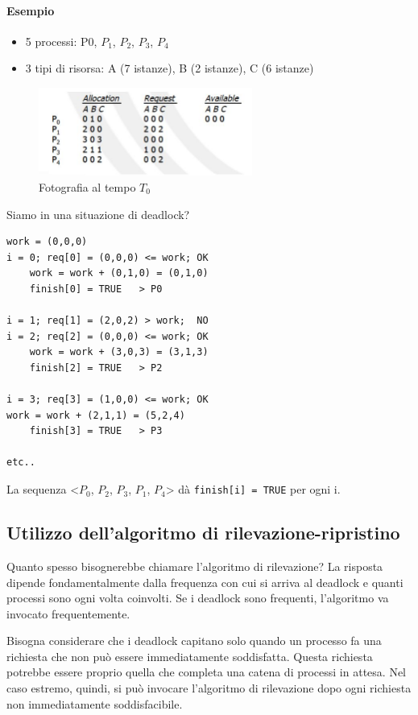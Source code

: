 \documentclass[a4paper]{article}
\begin{document}
\paragraph{Esempio}
\begin{itemize}
    \item 5 processi: P0, $P_1$, $P_2$, $P_3$, $P_4$
    \item 3 tipi di risorsa: A (7 istanze), B (2 istanze), C (6 istanze)
\end{itemize}

\begin{figure}[h!]
    \centering
    \includegraphics[width=7cm]{img/ril1.JPG}
    \caption{Fotografia al tempo $T_0$}
\end{figure}

Siamo in una situazione di deadlock?
\begin{Verbatim}[tabsize=3]
work = (0,0,0)
i = 0; req[0] = (0,0,0) <= work; OK
    work = work + (0,1,0) = (0,1,0)
    finish[0] = TRUE   > P0

i = 1; req[1] = (2,0,2) > work;  NO
i = 2; req[2] = (0,0,0) <= work; OK
    work = work + (3,0,3) = (3,1,3)
    finish[2] = TRUE   > P2

i = 3; req[3] = (1,0,0) <= work; OK
work = work + (2,1,1) = (5,2,4)
    finish[3] = TRUE   > P3

etc..
\end{Verbatim}

La sequenza <$P_0$, $P_2$, $P_3$, $P_1$, $P_4$> dà \verb|finish[i] = TRUE| per ogni i.

\subsection{Utilizzo dell'algoritmo di rilevazione-ripristino}
Quanto spesso bisognerebbe chiamare l'algoritmo di rilevazione? La risposta dipende fondamentalmente dalla frequenza con cui si arriva al deadlock e quanti processi sono ogni volta coinvolti. Se i deadlock sono frequenti, l'algoritmo va invocato frequentemente.

Bisogna considerare che i deadlock capitano solo quando un processo fa una richiesta che non può essere immediatamente soddisfatta. Questa richiesta potrebbe essere proprio quella che completa una catena di processi in attesa. Nel caso estremo, quindi, si può invocare l'algoritmo di rilevazione dopo ogni richiesta non immediatamente soddisfacibile.
\end{document}
